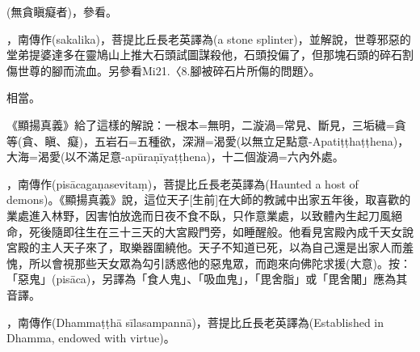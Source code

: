 \startitemgroup[noteitems]
\item{}(無貪瞋癡者)，參看。
\stopitemgroup

\startitemgroup[noteitems]
\item{}，南傳作(sakalika)，菩提比丘長老英譯為(a stone splinter)，並解說，世尊邪惡的堂弟提婆達多在靈鳩山上推大石頭試圖謀殺他，石頭投偏了，但那塊石頭的碎石割傷世尊的腳而流血。另參看Mi21.〈8.腳被碎石片所傷的問題〉。
\stopitemgroup

\startitemgroup[noteitems]
\item{}相當。
\stopitemgroup

\startitemgroup[noteitems]
\item{}《顯揚真義》給了這樣的解說：一根本=無明，二漩渦=常見、斷見，三垢穢=貪等(貪、瞋、癡)，五岩石=五種欲，深淵=渴愛(以無立足點意-Apatiṭṭhaṭṭhena)，大海=渴愛(以不滿足意-apūraṇīyaṭṭhena)，十二個漩渦=六內外處。
\stopitemgroup

\startitemgroup[noteitems]
\item{}，南傳作(pisācagaṇasevitaṃ)，菩提比丘長老英譯為(Haunted a host of demons)。《顯揚真義》說，這位天子[生前]在大師的教誡中出家五年後，取喜歡的業處進入林野，因害怕放逸而日夜不食不臥，只作意業處，以致體內生起刀風絕命，死後隨即往生在三十三天的大宮殿門旁，如睡醒般。他看見宮殿內成千天女說宮殿的主人天子來了，取樂器圍繞他。天子不知道已死，以為自己還是出家人而羞愧，所以會視那些天女眾為勾引誘惑他的惡鬼眾，而跑來向佛陀求援(大意)。按：「惡鬼」(pisāca)，另譯為「食人鬼」、「吸血鬼」，「毘舍脂」或「毘舍闍」應為其音譯。
\stopitemgroup

\startitemgroup[noteitems]
\item{}，南傳作(Dhammaṭṭhā sīlasampannā)，菩提比丘長老英譯為(Established in Dhamma, endowed with virtue)。
\stopitemgroup

